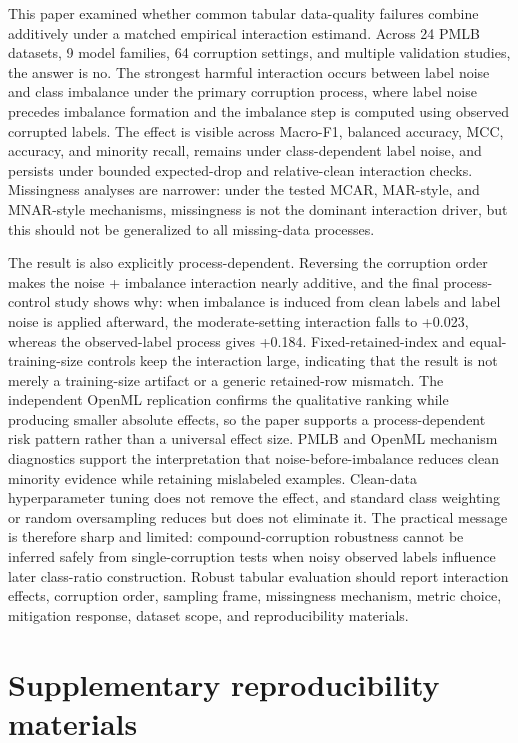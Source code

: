 \documentclass[preprint,12pt,number]{elsarticle}
\begin{document}
This paper examined whether common tabular data-quality failures combine additively under a matched empirical interaction estimand. Across 24 PMLB datasets, 9 model families, 64 corruption settings, and multiple validation studies, the answer is no. The strongest harmful interaction occurs between label noise and class imbalance under the primary corruption process, where label noise precedes imbalance formation and the imbalance step is computed using observed corrupted labels. The effect is visible across Macro-F1, balanced accuracy, MCC, accuracy, and minority recall, remains under class-dependent label noise, and persists under bounded expected-drop and relative-clean interaction checks. Missingness analyses are narrower: under the tested MCAR, MAR-style, and MNAR-style mechanisms, missingness is not the dominant interaction driver, but this should not be generalized to all missing-data processes.

The result is also explicitly process-dependent. Reversing the corruption order makes the noise + imbalance interaction nearly additive, and the final process-control study shows why: when imbalance is induced from clean labels and label noise is applied afterward, the moderate-setting interaction falls to +0.023, whereas the observed-label process gives +0.184. Fixed-retained-index and equal-training-size controls keep the interaction large, indicating that the result is not merely a training-size artifact or a generic retained-row mismatch. The independent OpenML replication confirms the qualitative ranking while producing smaller absolute effects, so the paper supports a process-dependent risk pattern rather than a universal effect size. PMLB and OpenML mechanism diagnostics support the interpretation that noise-before-imbalance reduces clean minority evidence while retaining mislabeled examples. Clean-data hyperparameter tuning does not remove the effect, and standard class weighting or random oversampling reduces but does not eliminate it. The practical message is therefore sharp and limited: compound-corruption robustness cannot be inferred safely from single-corruption tests when noisy observed labels influence later class-ratio construction. Robust tabular evaluation should report interaction effects, corruption order, sampling frame, missingness mechanism, metric choice, mitigation response, dataset scope, and reproducibility materials.

\appendix
\section{Supplementary reproducibility materials}
\end{document}
